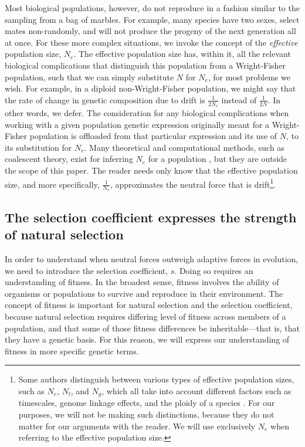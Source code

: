 \documentclass[twocolumn]{article}
\begin{document}
Most biological populations, however, do not reproduce in a fashion similar to the sampling from a bag of marbles. For example, many species have two sexes, select mates non-randomly, and will not produce the progeny of the next generation all at once. For these more complex situations, we invoke the concept of the \textit{effective} population size, $N_e$. The effective population size has, within it, all the relevant biological complications that distinguish this population from a Wright-Fisher population, such that we can simply substitute $N$ for $N_e$, for most problems we wish. For example, in a diploid non-Wright-Fisher population, we might say that the rate of change in genetic composition due to drift is $\frac{1}{2N_e}$ instead of $\frac{1}{2N}$. In other words, we defer. The consideration for any biological complications when working with a given population genetic expression originally meant for a Wright-Fisher population is offloaded from that particular expression and its use of $N$, to its substitution for $N_e$. Many theoretical and computational methods, such as coalescent theory, exist for inferring $N_e$ for a population \cite{charlesworth_2009}, but they are outside the scope of this paper. The reader needs only know that the effective population size, and more specifically, $\frac{1}{N_e}$, approximates the neutral force that is drift\footnote{Some authors distinguish between various types of effective population sizes, such as $N_e$, $N_l$, and $N_g$, which all take into account different factors such as timescales, genome linkage effects, and the ploidy of a species \cite{Lynch_2007, lynch2007origins}. For our purposes, we will not be making such distinctions, because they do not matter for our arguments with the reader. We will use exclusively $N_e$ when referring to the effective population size.}. 

\subsection{The selection coefficient expresses the strength of natural selection}

In order to understand when neutral forces outweigh adaptive forces in evolution, we need to introduce the selection coefficient, $s$. Doing so requires an understanding of fitness. In the broadest sense, fitness involves the ability of organisms or populations to survive and reproduce in their environment\cite{orr_2009}. The concept of fitness is important for natural selection and the selection coefficient, because natural selection requires differing level of fitness across members of a population, and that some of those fitness differences be inheritable---that is, that they have a genetic basis. For this reason, we will express our understanding of fitness in more specific genetic terms. 
\end{document}
